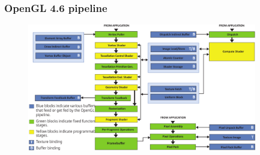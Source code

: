\begin{frame}
\frametitle{OpenGL 4.6 pipeline}
  \begin{figure}[h]
  \includegraphics[width=10cm,keepaspectratio]{pics/pipeline/OpenGL460Pipeline}
  \end{figure}
\end{frame}


